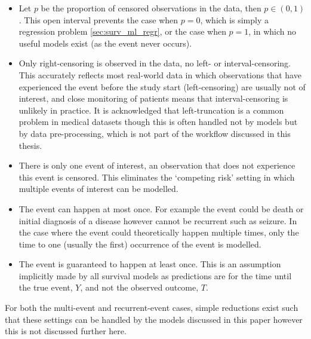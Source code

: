 \documentclass[
  letterpaper,
]{scrbook}
\providecommand{\tightlist}{%
  \setlength{\itemsep}{0pt}\setlength{\parskip}{0pt}}\usepackage{longtable,booktabs,array}
\theoremstyle{plain}
\theoremstyle{definition}
\theoremstyle{remark}
\begin{document}
\begin{itemize}
\tightlist
\item
  Let \(p\) be the proportion of censored observations in the data, then
  \(p \in (0,1)\). This open interval prevents the case when \(p = 0\),
  which is simply a regression problem \ref{sec:surv_ml_regr}, or the
  case when \(p = 1\), in which no useful models exist (as the event
  never occurs).
\item
  Only right-censoring is observed in the data, no left- or
  interval-censoring. This accurately reflects most real-world data in
  which observations that have experienced the event before the study
  start (left-censoring) are usually not of interest, and close
  monitoring of patients means that interval-censoring is unlikely in
  practice. It is acknowledged that left-truncation is a common problem
  in medical datasets though this is often handled not by models but by
  data pre-processing, which is not part of the workflow discussed in
  this thesis.
\item
  There is only one event of interest, an observation that does not
  experience this event is censored. This eliminates the `competing
  risk' setting in which multiple events of interest can be modelled.
\item
  The event can happen at most once. For example the event could be
  death or initial diagnosis of a disease however cannot be recurrent
  such as seizure. In the case where the event could theoretically
  happen multiple times, only the time to one (usually the first)
  occurrence of the event is modelled.
\item
  The event is guaranteed to happen at least once. This is an assumption
  implicitly made by all survival models as predictions are for the time
  until the true event, \(Y\), and not the observed outcome, \(T\).
\end{itemize}

For both the multi-event and recurrent-event cases, simple reductions
exist such that these settings can be handled by the models discussed in
this paper however this is not discussed further here.
\end{document}
